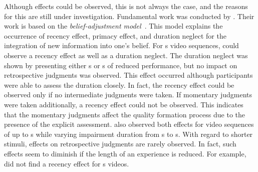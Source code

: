 Although effects could be observed, this is not always the case, and the reasons for this are still under investigation.
Fundamental work was conducted by \citet{hands_recency_2001}.
Their work is based on the \emph{belief-adjustment model}~\citep{hogarth_order_1992}.
This model explains the occurrence of recency effect, primacy effect, and duration neglect for the integration of new information into one's belief. %
For \unit[30]{s} video sequences, \citet{hands_recency_2001} could observe a recency effect as well as a duration neglect.
The duration neglect was shown by presenting either \unit[5]{s} or \unit[10]{s} of reduced performance, but no impact on retrospective judgments was observed.
This effect occurred although participants were able to assess the duration closely. %
In fact, the recency effect could be observed only if no intermediate judgments were taken.
If momentary judgments were taken additionally, a recency effect could not be observed.
This indicates that the momentary judgments affect the quality formation process due to the presence of the explicit assessment.
\citet{hamberg_time-varying_1999} also observed both effects for video sequences of up to \unit[180]{s} while varying impairment duration from \unit[2]{s} to \unit[10]{s}.
With regard to shorter stimuli, effects on retrospective judgments are rarely observed.
In fact, such effects seem to diminish if the length of an experience is reduced.
For example, \citet{ninassi_considering_2009} did not find a recency effect for \unit[8]{s} videos.

